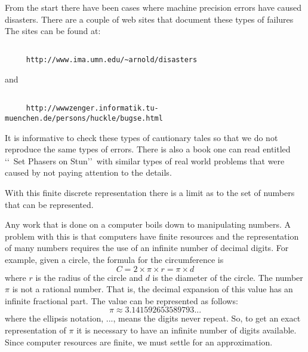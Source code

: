 \documentclass[10pt,fleqn]{article}
\begin{document}
From the start there have been cases where machine precision errors have caused
disasters. There are a couple of web sites that document these types of failures
The sites can be found at:
\begin{verbatim}

     http://www.ima.umn.edu/~arnold/disasters

\end{verbatim}
and
\begin{verbatim}

     http://wwwzenger.informatik.tu-muenchen.de/persons/huckle/bugse.html

\end{verbatim}
It is informative to check these types of cautionary tales so that we do not
reproduce the same types of errors. There is also a book one can read entitled
\lq\lq\ Set Phasers on Stun\rq\rq\ with similar types of real world problems
that were caused by not paying attention to the details.











With this finite discrete representation there is a limit as to the set of
numbers that can be represented.














Any work that is done on a computer boils down to manipulating numbers. A
problem with this is that computers have finite resources and the representation
of many numbers requires the use of an infinite number of decimal digits. For
example, given a circle, the formula for the circumference is
$$C = 2 \times \pi \times r = \pi \times d$$
where $r$ is the radius of the circle and $d$ is the diameter of the circle. The
number $\pi$ is not a rational number. That is, the decimal expansion of this
value has an infinite fractional part. The value can be represented as follows:
$$\pi\approx 3.141592653589793...$$
where the ellipsis notation, $...$, means the digits never repeat. So, to get an
exact representation of $\pi$ it is necessary to have an infinite number of
digits available. Since computer resources are finite, we must settle for an
approximation.
\end{document}
